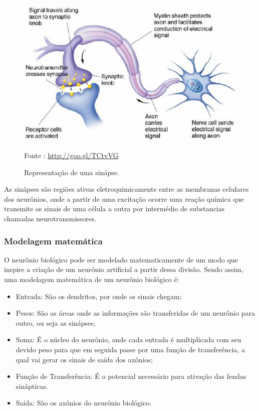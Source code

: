     \begin{figure}[h]
        \centering
        \label{fig02}
            \includegraphics[keepaspectratio=true, scale=0.4]{editaveis/images/sinapse.eps}
        \caption{Representação de uma sinápse.}
        Fonte : \url{http://goo.gl/TCtvVG}
    \end{figure}

    As sinápses são regiões ativas eletroquimicamente entre as membranas celulares dos neurônios, onde a partir de uma excitação ocorre uma reação química que transmite os sinais de uma célula a outra por intermédio de substancias chamadas neurotransmissores.

\subsubsection{Modelagem matemática}
    O neurônio biológico pode ser modelado matematicamente de um modo que inspire a criação de um neurônio artificial a partir dessa divisão. Sendo assim, uma modelagem matemática de um neurônio biológico é: \cite{rocha2006}

    \begin{itemize}
        \item Entrada: São os dendritos, por onde os sinais chegam;
        \item Pesos: São as áreas onde as informações são transferidas de um neurônio para outro,  ou seja as sinápses;
        \item Soma: É o núcleo do neurônio, onde cada entrada é multiplicada com seu devido peso para que em seguida passe por uma função de transferência, a qual vai gerar os sinais de saída dos axônios;
        \item Função de Transferência: É o potencial necessário para ativação das fendas sinápticas.
        \item Saída: São os axônios do neurônio biológico.
    \end{itemize}

